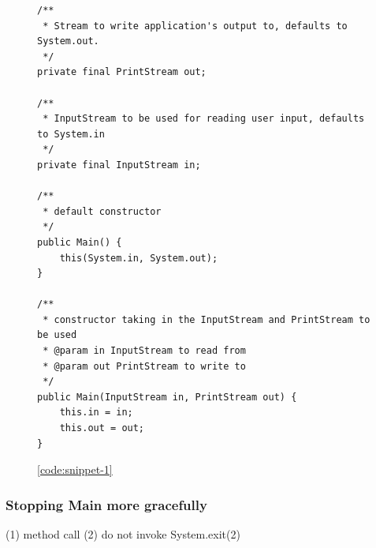 \par
\begin{figure}
\begin{lstlisting}
/**
 * Stream to write application's output to, defaults to System.out.
 */
private final PrintStream out;

/**
 * InputStream to be used for reading user input, defaults to System.in
 */
private final InputStream in;

/**
 * default constructor
 */
public Main() {
    this(System.in, System.out);
}

/**
 * constructor taking in the InputStream and PrintStream to be used
 * @param in InputStream to read from
 * @param out PrintStream to write to
 */
public Main(InputStream in, PrintStream out) {
    this.in = in;
    this.out = out;
}
\end{lstlisting} 
\ref{code:snippet-1}
\end{figure}

\subsubsection{Stopping Main more gracefully}
(1) method call 
(2) do not invoke System.exit(2) 

